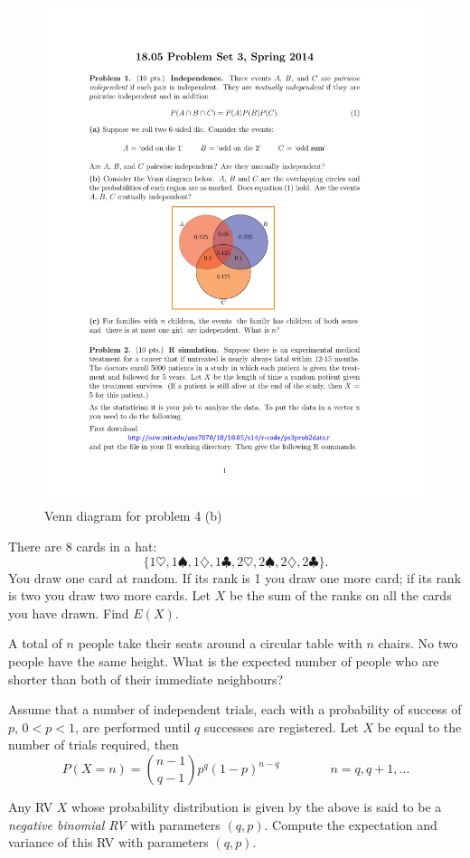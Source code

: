 \documentclass[a4paper,10pt,landscape,twocolumn]{scrartcl}
\begin{document}
\begin{figure}\centering
	\includegraphics[width=.2\textwidth]{03-venn}	
	\caption{Venn diagram for problem 4 (b)\label{fig:venn}}
\end{figure}



\begin{exercise}
There are $8$ cards in a hat:
	\[
		\{1\heartsuit, 1\spadesuit, 1\diamondsuit, 1\clubsuit, 2\heartsuit, 2\spadesuit, 2\diamondsuit, 2\clubsuit\}.
	\]
You draw one card at random. If its rank is 1 you draw one more card;
if its rank is two you draw two more cards. Let $X$ be the sum of the
ranks on all the cards you have drawn. Find $E(X)$.
	
\end{exercise}

\begin{exercise}
	A total of $n$ people take their seats around a circular table with $n$ chairs. No two people have the same height. What is the expected number of people who are shorter than both of their immediate neighbours?
\end{exercise}


%	


\begin{exercise}
 Assume that a number of independent trials, each with a probability of success of $p$, $0 < p < 1$, are performed until $q$ successes are registered. Let $X$ be equal to the number of trials required, then
	$$P(X = n) = {{n-1} \choose {q-1}} p^{q} (1 - p)^{n-q} \qquad \qquad n = q, q+1, ...$$

	Any RV $X$ whose probability distribution is given by the above is said to be a {\em negative binomial RV} with parameters $(q,p)$. Compute the expectation and variance of this RV with parameters $(q,p)$.	
\end{exercise}

\vfill
{}
\end{document}
